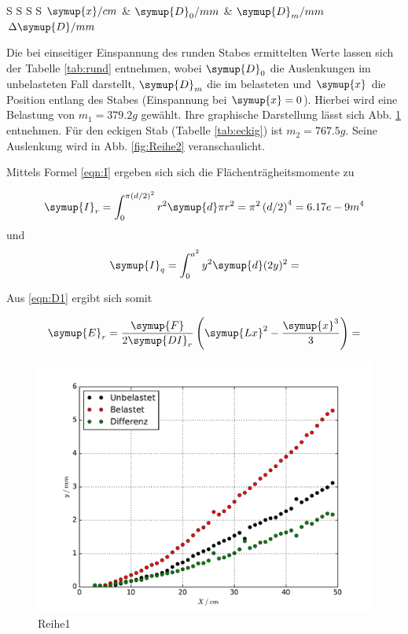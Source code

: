 \begin{table}
  \centering
\caption{Auslenkung des eckigen Stabes bei einseitiger Einspannung}
\label{tab:eckig}
\begin{tabular}{S S S S}
  \toprule
  {$\symup{x}/cm$} & {$\symup{D}_0/mm$} & {$\symup{D}_m/mm$} {$\Delta \symup{D}/mm$}\\
  \midrule
\bottomrule
\end{tabular}
\end{table}
\FloatBarrier

Die bei einseitiger Einspannung des runden Stabes ermittelten Werte lassen sich der Tabelle \ref{tab:rund} entnehmen, wobei $\symup{D}_0$ die Auslenkungen im unbelasteten Fall darstellt, $\symup{D}_m$ die im belasteten und $\symup{x}$ die Position entlang des Stabes (Einspannung bei $\symup{x}=0$). Hierbei wird eine Belastung von $m_1 = 379.2g$ gewählt. Ihre graphische Darstellung lässt sich Abb. \ref{fig:Reihe1} entnehmen.
Für den eckigen Stab (Tabelle \ref{tab:eckig}) ist $m_2 = 767.5g$. Seine Auslenkung wird in Abb. \ref{fig:Reihe2} veranschaulicht.

Mittels Formel \eqref{eqn:I} ergeben sich sich die Flächenträgheitsmomente zu

\begin{equation}
    \symup{I}_{r} = \int_{0}^{\pi (d/2)^2} r^2 \symup{d}\pi r^2 = \pi^2 \left( d/2 \right)^4 = 6.17e-9 m^4
\end{equation}
 und
\begin{equation}
  \symup{I}_{q} = \int_{0}^{a^2} y^2 \symup{d}(2y)^2 =
\end{equation}

Aus \ref{eqn:D1} ergibt sich somit

\begin{equation}
  \symup{E}_{r} = \frac{\symup{F}}{2\symup{DI}_{r}} \left( \symup{Lx}^2 - \frac{\symup{x}^3}{3} \right) =
\end{equation}

\begin{figure}
  \centering
  \includegraphics[width=\textwidth]{./Plots/Reihe1.pdf}
  \caption{Reihe1}
  \label{fig:Reihe1}
\end{figure}

